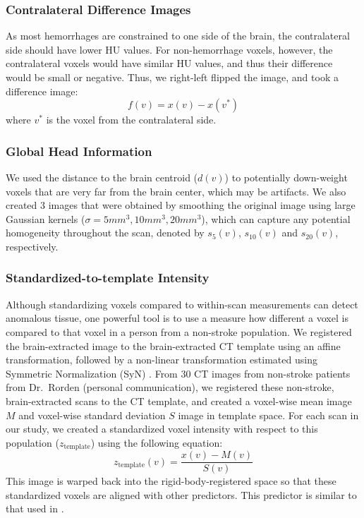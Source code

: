 \documentclass{elsarticle_nonatbib}\usepackage[]{graphicx}\usepackage[]{color}
\begin{document}
\subsubsection{Contralateral Difference Images}  As most hemorrhages are constrained to one side of the brain, the contralateral side should have lower HU values.  For non-hemorrhage voxels, however, the contralateral voxels would have similar HU values, and thus their difference would be small or negative.  Thus, we right-left flipped the image, and took a difference image: 
\begin{equation}
f(v) = x(v) - x(v^{*}) \label{eq:flip}
\end{equation}
where $v^{*}$ is the voxel from the contralateral side.  



\subsubsection{Global Head Information} We used the distance to the brain centroid ($d(v)$) to potentially down-weight voxels that are very far from the brain center, which may be artifacts.    We also created $3$ images that were obtained by smoothing the original image using large Gaussian kernels ($\sigma = 5mm^3, 10mm^3, 20mm^3$), which can capture any potential homogeneity throughout the scan, denoted by $s_{5}(v)$, $s_{10}(v)$ and $s_{20}(v)$, respectively.   

\subsubsection{Standardized-to-template Intensity}  
Although standardizing voxels compared to within-scan measurements can detect anomalous tissue, one powerful tool is to use a measure how different a voxel is compared to that voxel in a person from a non-stroke population.  We registered the brain-extracted image to the brain-extracted CT template using an affine transformation, followed by a non-linear transformation estimated using Symmetric Normalization (SyN) \citep{avants_symmetric_2008}.  
From $30$ CT images from non-stroke patients from Dr.~Rorden (personal communication), we registered these non-stroke, brain-extracted scans to the CT template, and created a voxel-wise mean image $M$ and voxel-wise standard deviation $S$ image in template space.  For each scan in our study, we created a standardized voxel intensity with respect to this population ($z_{\text{template}}$) using the following equation:
$$
z_{\text{template}}(v) = \frac{x(v) - M(v)}{S(v)}
$$
This image is warped back into the rigid-body-registered space so that these standardized voxels are aligned with other predictors.  This predictor is similar to that used in \citet{gillebert_automated_2014}.  
\end{document}
